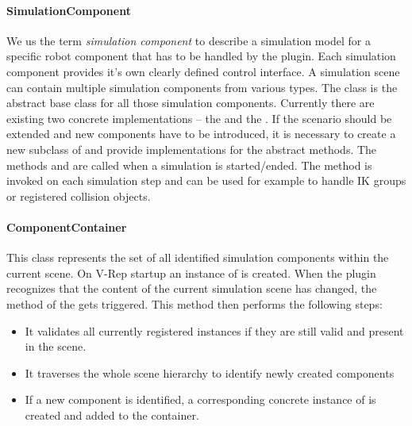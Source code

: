 \paragraph{SimulationComponent}

We us the term \emph{simulation component} to describe a simulation model for a specific robot component that has to be handled by the plugin. Each simulation component provides it's own clearly defined control interface. A simulation scene can contain multiple simulation components from various types. The  class is the abstract base class for all those simulation components. Currently there are existing two concrete implementations -- the  and the . If the scenario should be extended and new components have to be introduced, it is necessary to create a new subclass of  and provide implementations for the abstract methods. The methods  and  are called when a simulation is started/ended. The method  is invoked on each simulation step and can be used for example to handle IK groups or registered collision objects.

\paragraph{ComponentContainer}

This class represents the set of all identified simulation components within the current scene. On V-Rep startup an instance of  is created. When the plugin recognizes that the content of the current simulation scene has changed, the method  of the  gets triggered. This method then performs the following steps:
\begin{itemize}

\item
It validates all currently registered  instances if they are still valid and present in the scene.
\item
It traverses the whole scene hierarchy to identify newly created components
\item
If a new component is identified, a corresponding concrete instance of  is created and added to the container.

\end{itemize}
  
